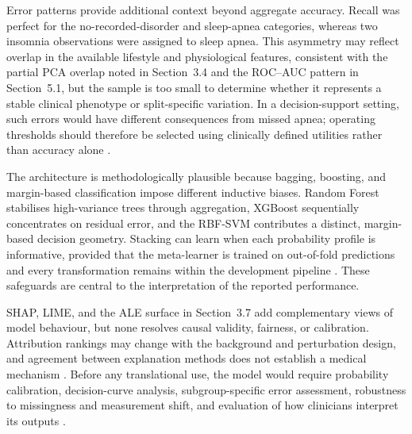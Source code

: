 \documentclass{elektr}
\begin{document}
Error patterns provide additional context beyond aggregate accuracy. Recall was perfect for the no-recorded-disorder and sleep-apnea categories, whereas two insomnia observations were assigned to sleep apnea. This asymmetry may reflect overlap in the available lifestyle and physiological features, consistent with the partial PCA overlap noted in Section~3.4 and the ROC--AUC pattern in Section~5.1, but the sample is too small to determine whether it represents a stable clinical phenotype or split-specific variation. In a decision-support setting, such errors would have different consequences from missed apnea; operating thresholds should therefore be selected using clinically defined utilities rather than accuracy alone \cite{riley2024,futureai2025}.

The architecture is methodologically plausible because bagging, boosting, and margin-based classification impose different inductive biases. Random Forest stabilises high-variance trees through aggregation, XGBoost sequentially concentrates on residual error, and the RBF-SVM contributes a distinct, margin-based decision geometry. Stacking can learn when each probability profile is informative, provided that the meta-learner is trained on out-of-fold predictions and every transformation remains within the development pipeline \cite{borisov2024,kapoor2023}. These safeguards are central to the interpretation of the reported performance.

SHAP, LIME, and the ALE surface in Section~3.7 add complementary views of model behaviour, but none resolves causal validity, fairness, or calibration. Attribution rankings may change with the background and perturbation design, and agreement between explanation methods does not establish a medical mechanism \cite{instanceshap2023,jung2023,pesapane2026}. Before any translational use, the model would require probability calibration, decision-curve analysis, subgroup-specific error assessment, robustness to missingness and measurement shift, and evaluation of how clinicians interpret its outputs \cite{hu2024,tripodai2024,futureai2025}.
\end{document}
